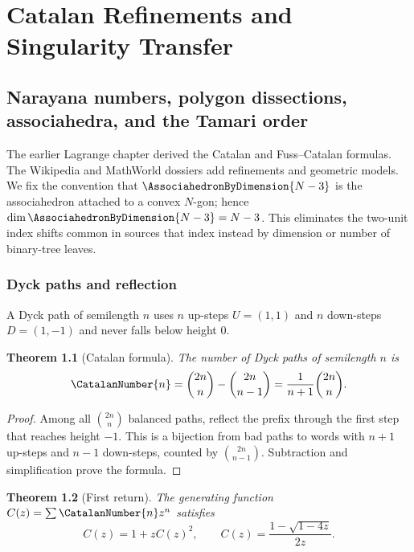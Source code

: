\documentclass[11pt,a4paper,oneside,openany]{book}
\newtheorem{theorem}{Theorem}[chapter]
\theoremstyle{definition}
\theoremstyle{remark}
\begin{document}
\part{Catalan Refinements and Singularity Transfer}

\chapter{Narayana numbers, polygon dissections, associahedra, and the Tamari order}
\label{ch:merged-catalan-refinements}

The earlier Lagrange chapter derived the Catalan and Fuss--Catalan formulas.
The Wikipedia and MathWorld dossiers add refinements and geometric models.
We fix the convention that $\AssociahedronByDimension{N-3}$ is the associahedron attached to a
convex $N$-gon; hence $\dim\AssociahedronByDimension{N-3}=N-3$.  This eliminates the two-unit
index shifts common in sources that index instead by dimension or number of
binary-tree leaves.

\section{Dyck paths and reflection}

A Dyck path of semilength $n$ uses $n$ up-steps $U=(1,1)$ and $n$ down-steps
$D=(1,-1)$ and never falls below height $0$.

\begin{theorem}[Catalan formula]
\label{thm:merged-catalan-reflection}
The number of Dyck paths of semilength $n$ is
\begin{equation}
 \CatalanNumber{n}=\binom{2n}{n}-\binom{2n}{n-1}
 =\frac1{n+1}\binom{2n}{n}.                                       \label{eq:merged-catalan-reflection}
\end{equation}
\end{theorem}

\begin{proof}
Among all $\binom{2n}{n}$ balanced paths, reflect the prefix through the first
step that reaches height $-1$.  This is a bijection from bad paths to words
with $n+1$ up-steps and $n-1$ down-steps, counted by
$\binom{2n}{n-1}$.  Subtraction and simplification prove the formula.
\end{proof}

\begin{theorem}[First return]
\label{thm:merged-catalan-first-return}
The generating function $C(z)=\sum \CatalanNumber{n}z^n$ satisfies
\begin{equation}
 C(z)=1+zC(z)^2,
 \qquad C(z)=\frac{1-\sqrt{1-4z}}{2z}.                              \label{eq:merged-catalan-gf}
\end{equation}
\end{theorem}
\end{document}
